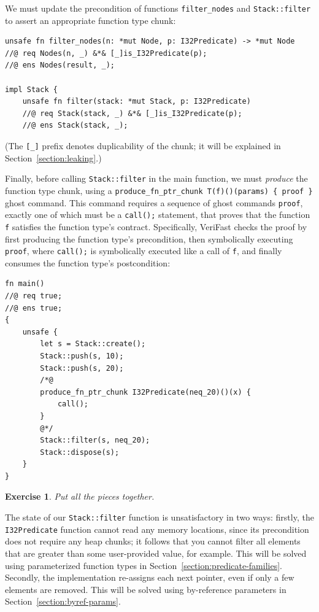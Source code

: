 \documentclass{article}
\newtheorem{exercise}{Exercise}
\begin{document}
We must update the precondition of functions \lstinline|filter_nodes| and \lstinline|Stack::filter| to
assert an appropriate function type chunk:
\begin{lstlisting}
unsafe fn filter_nodes(n: *mut Node, p: I32Predicate) -> *mut Node
//@ req Nodes(n, _) &*& [_]is_I32Predicate(p);
//@ ens Nodes(result, _);

impl Stack {
    unsafe fn filter(stack: *mut Stack, p: I32Predicate)
    //@ req Stack(stack, _) &*& [_]is_I32Predicate(p);
    //@ ens Stack(stack, _);
\end{lstlisting}
(The \lstinline|[_]| prefix denotes duplicability of the chunk; it will be explained in Section~\ref{section:leaking}.)

Finally, before calling \lstinline|Stack::filter| in the main function, we must \emph{produce} the function type chunk, using a \lstinline|produce_fn_ptr_chunk T(f)()(params) { proof }| ghost command. This command requires a sequence of ghost commands \lstinline|proof|, exactly one of which must be a \lstinline|call();| statement, that proves that the function \lstinline|f| satisfies the function type's contract. Specifically, VeriFast checks the proof by first producing the function type's precondition, then symbolically executing \lstinline|proof|, where \lstinline|call();| is symbolically executed like a call of \lstinline|f|, and finally consumes the function type's postcondition:
\begin{lstlisting}
fn main()
//@ req true;
//@ ens true;
{
    unsafe {
        let s = Stack::create();
        Stack::push(s, 10);
        Stack::push(s, 20);
        /*@
        produce_fn_ptr_chunk I32Predicate(neq_20)()(x) {
            call();
        }
        @*/
        Stack::filter(s, neq_20);
        Stack::dispose(s);
    }
}
\end{lstlisting}

\begin{exercise}\label{exercise:filter}
Put all the pieces together.
\end{exercise}

The state of our \lstinline!Stack::filter! function is
unsatisfactory in two ways: firstly, the
\lstinline!I32Predicate! function cannot read any memory
locations, since its precondition does not require any heap
chunks; it follows that you cannot filter all elements that are
greater than some user-provided value, for example. This will
be solved using parameterized function types in
Section~\ref{section:predicate-families}. Secondly, the
implementation re-assigns each next pointer, even if only a few
elements are removed. This will be solved using by-reference
parameters in Section~\ref{section:byref-params}.
\end{document}
